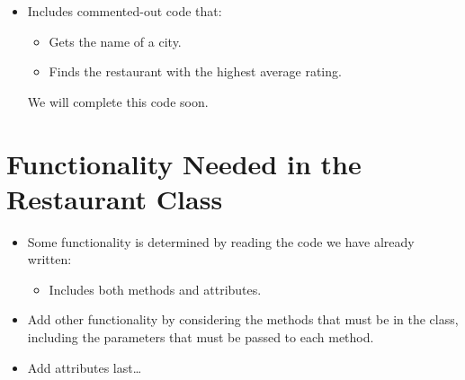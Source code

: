 \documentclass[letterpaper,10pt,english]{sphinxmanual}
\begin{document}
\begin{itemize}
\begin{itemize}
\item {} 
Includes commented-out code that:
\begin{itemize}
\item {} 
Gets the name of a city.

\item {} 
Finds the restaurant with the highest average rating.

\end{itemize}

We will complete this code soon.

\end{itemize}

\end{itemize}


\section{Functionality Needed in the Restaurant Class}
\label{\detokenize{lecture_notes/lec19_classes2:functionality-needed-in-the-restaurant-class}}\begin{itemize}
\item {} 
Some functionality is determined by reading the code we have
already written:
\begin{itemize}
\item {} 
Includes both methods and attributes.

\end{itemize}

\item {} 
Add other functionality by considering the methods that must be in
the  class, including the parameters that must be
passed to each method.

\item {} 
Add attributes last…

\end{itemize}
\end{document}
